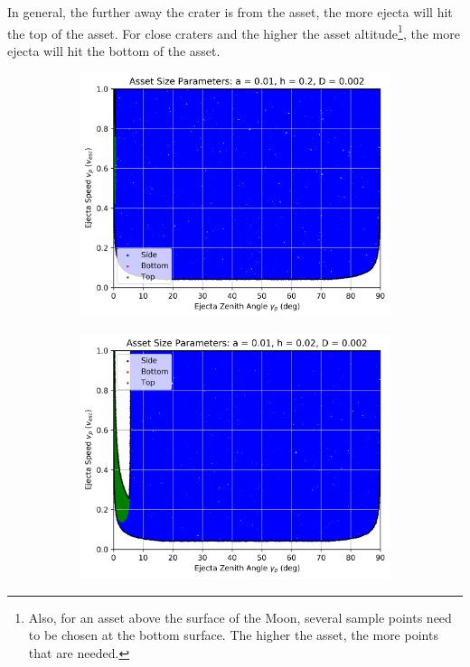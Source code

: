 \documentclass{article}
\begin{document}
In general, the further away the crater is from the asset, the more ejecta will hit the top of the asset. For close craters and the higher the asset altitude\footnote{Also, for an asset above the surface of the Moon, several sample points need to be chosen at the bottom surface. The higher the asset, the more points that are needed.}, the more ejecta will hit the bottom of the asset.

\begin{figure}
	\begin{subfigure}[t]{.32\textwidth}
		\centering
		\includegraphics[width=.95\linewidth]{asset_speed_zenith_plot_1.000e-02_2.000e-01_2.000e-03.png}  
		\label{fig:sub-asset_speed_zenith_1}
	\end{subfigure}
	\begin{subfigure}[t]{.32\textwidth}
		\centering
		\includegraphics[width=.95\linewidth]{asset_speed_zenith_plot_1.000e-02_2.000e-02_2.000e-03.png}  

\end{subfigure}
\end{figure}
\end{document}
